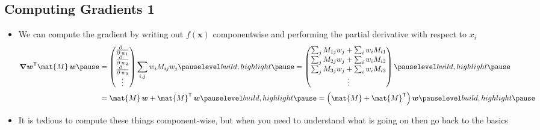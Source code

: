 \begin{slide}
\section{Computing Gradients 1}

\begin{PauseHighLight}
  \begin{itemize}
  \item We can compute the gradient by writing out $f(\bm{x})$
    componentwise and performing the partial derivative with respect
    to $x_i$\pause
    \begin{align*}
      \grad \bm{w}^\tr \mat{M}\, \bm{w}\pause &=
      \begin{pmatrix}
        \pd{\ }{w_1} \\  \pd{\ }{w_2} \\  \pd{\ }{w_3} \\ \vdots
      \end{pmatrix}
      \sum_{i,j} w_i M_{ij} w_j \pauseb =
      \begin{pmatrix}
        \sum_j M_{1j} w_j + \sum_i w_i M_{i1} \\
        \sum_j M_{2j} w_j + \sum_i w_i M_{i2} \\
        \sum_j M_{3j} w_j + \sum_i w_i M_{i3} \\ \vdots
      \end{pmatrix} \pauseb\\
         &= \mat{M}\, \bm{w} + \mat{M}^\tr\, \bm{w}\pauseb
           = \bra{\mat{M} + \mat{M}^\tr} \bm{w}\pauseb
    \end{align*}
  \item It is tedious to compute these things component-wise, but when
    you need to understand what is going on then go back to the basics\pauseb
  \end{itemize}
\end{PauseHighLight}
  

\end{slide}




